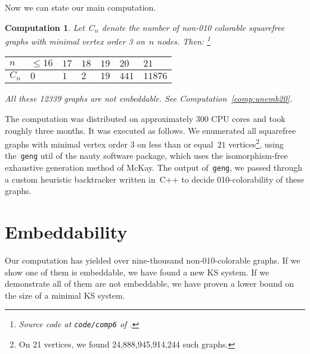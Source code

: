 \documentclass{report}
\newtheorem{comp}{Computation}[section]
\begin{document}
Now we can state our main computation.
\begin{comp}
    Let~$C_n$ denote the number of non-010 colorable squarefree
    graphs with minimal vertex order 3 on~$n$ nodes.  Then:%
        \footnote{Source code at \texttt{code/comp6} of \cite{GH}.}

    \begin{center}
    \begin{tabular}{l|llllll}
        $n$ & $\leq 16$
            & $17$
            & $18$
            & $19$
            & $20$
            & $21$ \\
        \hline
        $C_n$ & $0$
            & $1$
            & $2$
            & $19$
            & $441$
            & $11876$
    \end{tabular}
    \end{center}

    All these 12339 graphs are not embeddable.
    See Computation~\ref{comp:unemb20}.
\end{comp}
The computation was distributed on approximately 300 CPU cores
and took roughly three months.
It was executed as follows.
We enumerated all squarefree graphs with minimal vertex
order 3 on less than or equal~$21$ vertices\footnote{%
On 21 vertices, we found 24,888,945,914,244 such graphs.},
using the~\texttt{geng} util of the nauty software package,
which uses the isomorphism-free exhaustive generation
method of McKay\cite{geng}.
The output of~\texttt{geng}, we passed through
a custom heuristic backtracker written in~C++
to decide 010-colorability of these graphs.

\section{Embeddability}\label{sec:emb}
Our computation has yielded over nine-thousand non-010-colorable graphs.
If we show one of them is embeddable, we have found a new KS system.
If we demonstrate all of them are not embeddable, we have
proven a lower bound on the size of a minimal KS system.
\end{document}
